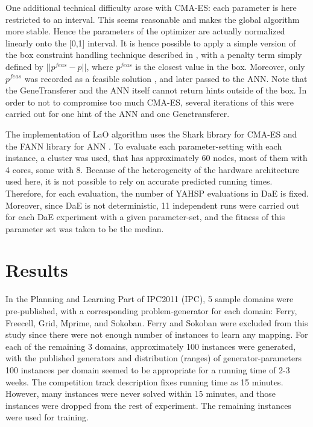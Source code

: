 \documentclass[runningheads,a4paper]{llncs}
\begin{document}
One additional technical difficulty arose with CMA-ES: each parameter is here restricted to an interval. This seems reasonable and makes the global algorithm more stable. Hence the parameters of the optimizer are actually normalized linearly onto the [0,1] interval. It is hence possible to apply a simple version of the box constraint handling technique described in \cite{hansen2009tec}, with a penalty term simply defined by \begin{math}||p^{feas}-p|| \end{math}, where \begin{math}p^{feas}\end{math} is the closest value in the box. Moreover, only \begin{math}p^{feas}\end{math} was recorded as a feasible solution , and later passed to the ANN. Note that the GeneTransferer and the ANN itself cannot return hints outside of the box. In order to not to compromise too much CMA-ES, several iterations of this were carried out for one hint of the ANN and one Genetransferer.

The implementation of LaO algorithm uses the Shark library \cite{shark08} for CMA-ES and the FANN library for ANN \cite{nissen}. To evaluate each parameter-setting with each instance,  a cluster was used, that has approximately 60 nodes, most of them with 4 cores, some with 8. Because of the heterogeneity of the hardware architecture used here, it is not possible to rely on accurate predicted running times. Therefore, for each evaluation, the number of YAHSP evaluations in DaE is fixed. Moreover, since DaE is not deterministic, 11 independent runs were carried out for each DaE experiment with a given parameter-set, and the fitness of this parameter set was taken to be the median.

\section{Results}
\label{section:results}

In the Planning and Learning Part of IPC2011 (IPC), 5 sample domains were pre-published, with a corresponding problem-generator for each domain: Ferry, Freecell, Grid, Mprime, and Sokoban. Ferry and Sokoban were excluded from this study since there were not enough number of instances to learn any mapping. For each of the remaining 3 domains, approximately 100 instances were generated, with the published generators and distribution (ranges) of generator-parameters 100 instances per domain seemed to be appropriate for a running time of 2-3 weeks. The competition track description fixes running time as 15 minutes. However, many instances were never solved within 15 minutes, and those instances were dropped from the rest of experiment. The remaining instances were used for training.
\end{document}
